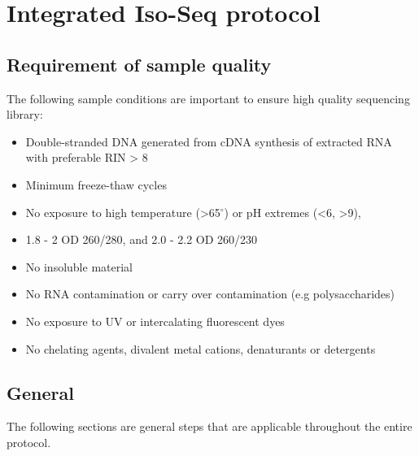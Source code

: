 \chapter{Integrated Iso-Seq protocol}\label{app_longread_protocol}

\stoptocwriting

\section{Requirement of sample quality}
The following sample conditions are important to ensure high quality sequencing library: 
\begin{itemize}
	\item Double-stranded DNA generated from cDNA synthesis of extracted RNA with preferable RIN > 8
	\item Minimum freeze-thaw cycles 
	\item No exposure to high temperature (>65$^{\circ}$) or pH extremes (<6, >9), 
	\item 1.8 - 2 OD 260/280, and 2.0 - 2.2 OD 260/230 
	\item No insoluble material  
	\item No RNA contamination or carry over contamination (e.g polysaccharides)
	\item No exposure to UV or intercalating fluorescent dyes 
	\item No chelating agents, divalent metal cations, denaturants or detergents
	
\end{itemize}

\section{General}
The following sections are general steps that are applicable throughout the entire protocol. 

